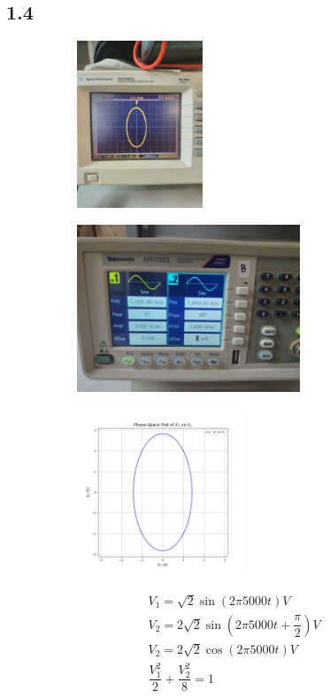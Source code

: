 \documentclass[a4paper,12pt]{article}
\begin{document}
\subsection*{1.4}
\begin{figure}[H]
    \centering
    \begin{subfigure}{0.5\textwidth}
        \centering
        \includegraphics[height=5cm]{figs/4/plot.jpeg}
    \end{subfigure}%
    \begin{subfigure}{0.5\textwidth}
        \centering
        \includegraphics[height=5cm]{figs/4/para.jpeg}
    \end{subfigure}
    \begin{subfigure}{0.5\textwidth}
        \centering
        \includegraphics[height=5cm]{figs/4/pyplot.png}
    \end{subfigure}%
\end{figure}
\begin{align}
    &V_1=\sqrt{2}\sin(2\pi 5000t) V\\
    &V_2=2\sqrt{2}\sin(2\pi 5000t+\dfrac{\pi}{2}) V\\
    &V_2=2\sqrt{2}\cos(2\pi 5000t) V\\
    &\dfrac{V_1^2}{2}+\dfrac{V_2^2}{8}=1
\end{align}
\end{document}
